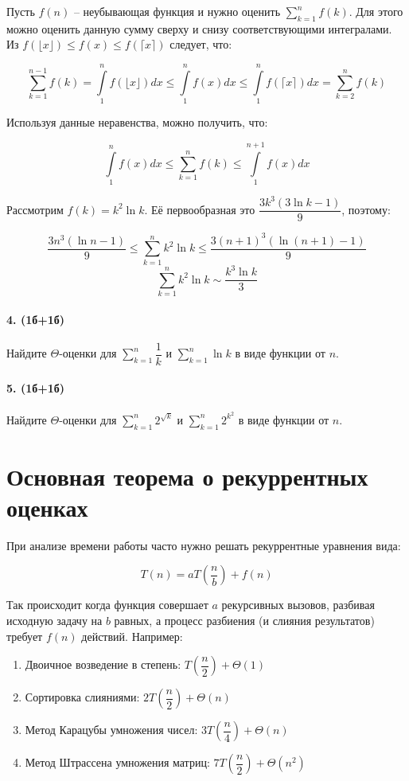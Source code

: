 \documentclass{article}
\begin{document}
Пусть $f(n)$ -- неубывающая функция и нужно оценить $\sum\limits_{k=1}^{n}f(k)$. Для этого можно оценить данную сумму сверху и снизу соответствующими интегралами. Из $f(\lfloor x \rfloor) \leq f(x) \leq f(\lceil x \rceil)$ следует, что:

$$\sum\limits_{k=1}^{n-1} f(k) = \int\limits_{1}^n f(\lfloor x \rfloor)dx \leq \int\limits_{1}^n f(x) dx \leq \int\limits_{1}^n f(\lceil x \rceil)dx=\sum\limits_{k=2}^n f(k)$$

Используя данные неравенства, можно получить, что:

$$\int\limits_1^n f(x) dx\leq \sum\limits_{k=1}^{n}f(k) \leq \int\limits_1^{n+1} f(x) dx$$

Рассмотрим $f(k)=k^2 \ln k$. Её первообразная это $\dfrac{3k^3(3\ln k-1)}{9}$, поэтому:

$$\dfrac{3n^3(\ln n-1)}{9} \leq \sum\limits_{k=1}^n k^2 \ln k \leq \dfrac{3(n+1)^3(\ln(n+1)-1)}{9}$$ $$\sum\limits_{k=1}^n k^2 \ln k \sim \dfrac{k^3 \ln k}{3}$$


\paragraph{4. (1б+1б)} Найдите $\Theta$-оценки для $\sum\limits_{k=1}^n \dfrac 1 k$ и $\sum\limits_{k=1}^n \ln k$ в виде функции от $n$.
\paragraph{5. (1б+1б)} Найдите $\Theta$-оценки для $\sum\limits_{k=1}^n 2^{\sqrt k}$ и $\sum\limits_{k=1}^n 2^{k^2}$ в виде функции от $n$.

\section*{Основная теорема о рекуррентных оценках}

При анализе времени работы часто нужно решать рекуррентные уравнения вида:

$$T(n) = aT\left(\dfrac n b\right) + f(n)$$

Так происходит когда функция совершает $a$ рекурсивных вызовов, разбивая исходную задачу на $b$ равных, а  процесс разбиения (и слияния результатов) требует $f(n)$ действий. Например:
\begin{enumerate}
    \item Двоичное возведение в степень: $T\left(\dfrac n 2\right) + \Theta(1)$
    \item Сортировка слияниями: $2T\left(\dfrac n 2\right) + \Theta(n)$
    \item Метод Карацубы умножения чисел: $3T\left(\dfrac{n}{4}\right)+\Theta(n)$
    \item Метод Штрассена умножения матриц: $7T\left(\dfrac{n}{2}\right)+\Theta(n^2)$
\end{enumerate}
\end{document}

